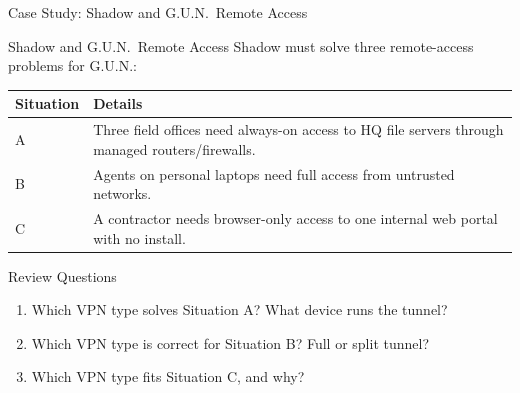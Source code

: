 \documentclass[aspectratio=169]{beamer}  %
\begin{document}
\begin{frame}[t]{Case Study: Shadow and G.U.N.\ Remote Access}
    \begin{casestudy}{Shadow and G.U.N.\ Remote Access}
        \footnotesize
        Shadow must solve three remote-access problems for G.U.N.:

        \vspace{0.1em}
        \begin{center}
            \begin{tabular}{l p{7.8cm}}
                \toprule
                \textbf{Situation} & \textbf{Details} \\
                \midrule
                A & Three field offices need always-on access to HQ file servers through managed routers/firewalls. \\
                B & Agents on personal laptops need full access from untrusted networks. \\
                C & A contractor needs browser-only access to one internal web portal with no install. \\
                \bottomrule
            \end{tabular}
        \end{center}
    \end{casestudy}
    \begin{block}{Review Questions}
        \begin{enumerate}
            \footnotesize
            \item Which VPN type solves Situation A? What device runs the tunnel?
            \item Which VPN type is correct for Situation B? Full or split tunnel?
            \item Which VPN type fits Situation C, and why?
        \end{enumerate}
    \end{block}
\end{frame}
\end{document}
